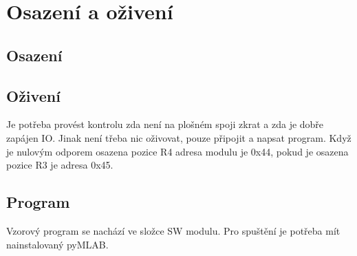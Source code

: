 \documentclass[11pt,a4paper]{article}
\begin{document}
\section{Osazení a oživení}\label{osazenuxed-a-oux17eivenuxed}

\subsection{Osazení}\label{osazenuxed}

\subsection{Oživení}\label{oux17eivenuxed}

Je potřeba provést kontrolu zda není na plošném spoji zkrat a zda je
dobře zapájen IO. Jinak není třeba nic oživovat, pouze připojit a napsat
program. Když je nulovým odporem osazena pozice R4 adresa modulu je
0x44, pokud je osazena pozice R3 je adresa 0x45.

\subsection{Program}\label{program}

Vzorový program se nachází ve složce SW modulu. Pro spuštění je potřeba
mít nainstalovaný pyMLAB.
\end{document}
